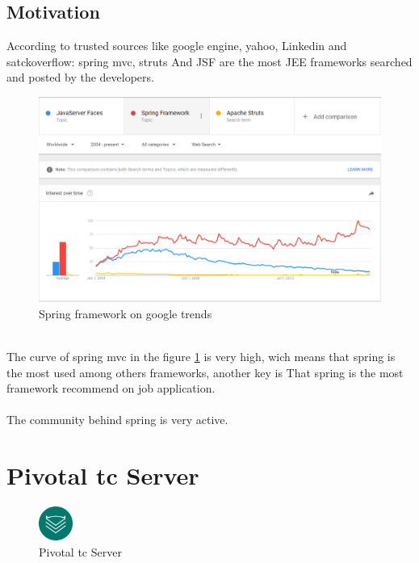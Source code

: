 \subsection{Motivation}
According to trusted sources like google engine, yahoo, Linkedin and satckoverflow: spring mvc, struts And JSF are the most JEE frameworks searched and posted by the developers.\\
\begin{figure}[h]

	\centering
	\includegraphics[width=1.0\textwidth]{SpringMVC_statics_google_trends.png}
	\caption{Spring framework on google trends}
	\label{SpringMVC_statics_google_trends}
\end{figure}
\\
The curve of spring mvc in the figure \ref{SpringMVC_statics_google_trends} is very high, wich means that spring is the most used among others frameworks, another key is That spring is the most framework recommend on job application.
\\
\\
The community behind spring is very active.

\clearpage
\newpage

\section{Pivotal tc Server}

\begin{figure}[h]
	
	\centering
	\includegraphics[width=0.1\textwidth]{icon_tcserver.png}
	\caption{Pivotal tc Server}
	\label{Pivotal tc Server}
\end{figure}

